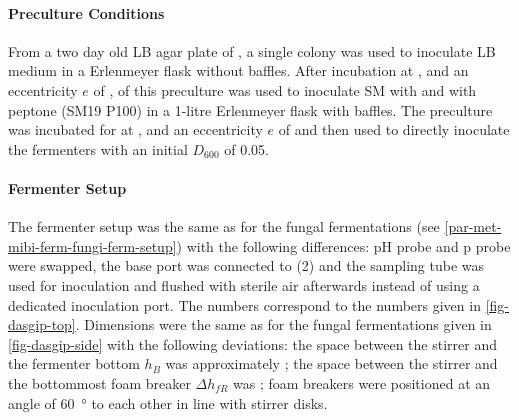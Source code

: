 \paragraph{Preculture Conditions}
From a two day old LB agar plate of \strain{}, a single colony was used to inoculate  LB medium in a  Erlenmeyer flask without baffles. After  incubation at ,  and an eccentricity $e$ of ,  of this preculture was used to inoculate  SM with  \glc{} and  \xyl{} with  peptone (SM19 P100) in a 1-litre Erlenmeyer flask with baffles. The preculture was incubated for  at ,  and an eccentricity $e$ of  and then used to directly inoculate the fermenters with an initial $D_{600}$ of \num{0.05}.

\paragraph{Fermenter Setup}
The fermenter setup was the same as for the fungal fermentations (see \vref{par-met-mibi-ferm-fungi-ferm-setup}) with the following differences: pH probe and p probe were swapped, the base port was connected to (2) and the sampling tube was used for inoculation and flushed with sterile air afterwards instead of using a dedicated inoculation port. The numbers correspond to the numbers given in \vref{fig-dasgip-top}. Dimensions were the same as for the fungal fermentations given in \vref{fig-dasgip-side} with the following deviations: the space between the stirrer and the fermenter bottom $h_B$ was approximately ; the space between the stirrer and the bottommost foam breaker $\Delta{}h_{fR}$ was ; foam breakers were positioned at an angle of \SI{60}{\degree} to each other in line with stirrer disks.

